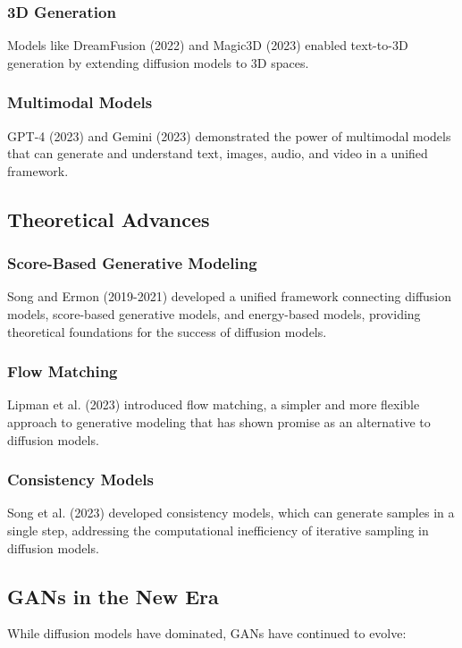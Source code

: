 \subsubsection*{3D Generation}
Models like DreamFusion (2022) and Magic3D (2023) enabled text-to-3D generation by extending diffusion models to 3D spaces.

\subsubsection*{Multimodal Models}
GPT-4 (2023) and Gemini (2023) demonstrated the power of multimodal models that can generate and understand text, images, audio, and video in a unified framework.

\subsection*{Theoretical Advances}

\subsubsection*{Score-Based Generative Modeling}
Song and Ermon (2019-2021) developed a unified framework connecting diffusion models, score-based generative models, and energy-based models, providing theoretical foundations for the success of diffusion models.

\subsubsection*{Flow Matching}
Lipman et al. (2023) introduced flow matching, a simpler and more flexible approach to generative modeling that has shown promise as an alternative to diffusion models.

\subsubsection*{Consistency Models}
Song et al. (2023) developed consistency models, which can generate samples in a single step, addressing the computational inefficiency of iterative sampling in diffusion models.

\subsection*{GANs in the New Era}

While diffusion models have dominated, GANs have continued to evolve:


